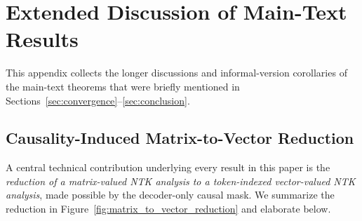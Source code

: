 \documentclass[11pt]{article}
\theoremstyle{plain}
\begin{document}
\section{Extended Discussion of Main-Text Results}\label{app:extended}

This appendix collects the longer discussions and informal-version corollaries of the main-text theorems that were briefly mentioned in Sections~\ref{sec:convergence}--\ref{sec:conclusion}.

\subsection{Causality-Induced Matrix-to-Vector Reduction}\label{app_sub:matrix_to_vector}

A central technical contribution underlying every result in this paper is the {\it reduction of a matrix-valued NTK analysis to a token-indexed vector-valued NTK analysis}, made possible by the decoder-only causal mask. We summarize the reduction in Figure~\ref{fig:matrix_to_vector_reduction} and elaborate below.
\end{document}
